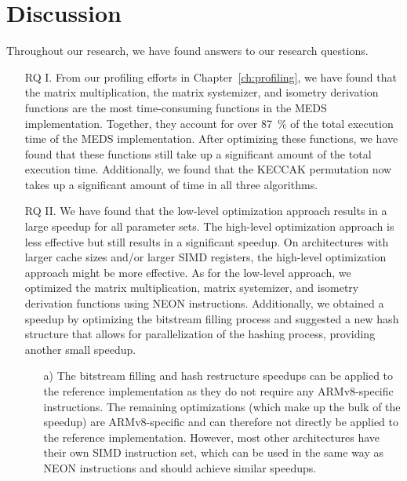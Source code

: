 \documentclass[11pt,a4paper]{report}
\theoremstyle{definition}
\begin{document}
\section{Discussion}
Throughout our research, we have found answers to our research questions.
\begin{itemize}[left=35pt,labelsep=15pt]
  \item[RQ I.] From our profiling efforts in Chapter~\ref{ch:profiling}, we have found that the matrix multiplication, the matrix systemizer, and isometry derivation functions are the most time-consuming functions in the MEDS implementation. Together, they account for over 87~\% of the total execution time of the MEDS implementation. After optimizing these functions, we have found that these functions still take up a significant amount of the total execution time. Additionally, we found that the KECCAK permutation now takes up a significant amount of time in all three algorithms.
  \item[RQ II.] We have found that the low-level optimization approach results in a large speedup for all parameter sets. The high-level optimization approach is less effective but still results in a significant speedup. On architectures with larger cache sizes and/or larger SIMD registers, the high-level optimization approach might be more effective. As for the low-level approach, we optimized the matrix multiplication, matrix systemizer, and isometry derivation functions using NEON instructions. Additionally, we obtained a speedup by optimizing the bitstream filling process and suggested a new hash structure that allows for parallelization of the hashing process, providing another small speedup.
        \begin{itemize}
          \item[a)] The bitstream filling and hash restructure speedups can be applied to the reference implementation as they do not require any ARMv8-specific instructions. The remaining optimizations (which make up the bulk of the speedup) are ARMv8-specific and can therefore not directly be applied to the reference implementation. However, most other architectures have their own SIMD instruction set, which can be used in the same way as NEON instructions and should achieve similar speedups.
        \end{itemize}
\end{itemize}
\end{document}
